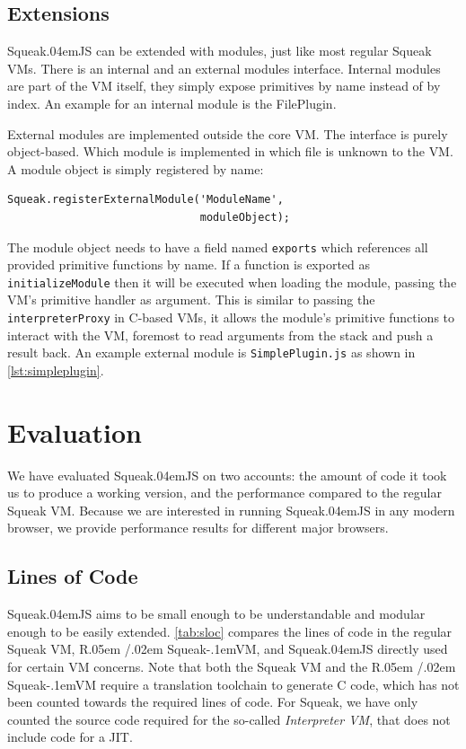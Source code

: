 \documentclass[natbib]{sigplanconf}
\newcommand*\SqueakJS{Squeak\texorpdfstring{\kern.04em}{}JS\xspace}
\newcommand*\RSqueakVM{R\kern.05em /\kern.02em Squeak\kern-.1emVM\xspace}
\begin{document}
\subsection{Extensions}

\SqueakJS can be extended with modules, just like most regular Squeak
\acp{VM}. There is an internal and an external modules interface.
Internal modules are part of the \ac{VM} itself, they simply expose
primitives by name instead of by index. An example for an internal
module is the FilePlugin.

External modules are implemented outside the core \ac{VM}. The
interface is purely object-based. Which module is implemented in which
file is unknown to the \ac{VM}. A module object is simply registered
by name:
\begin{lstlisting}[numbers=none,columns=fixed]
Squeak.registerExternalModule('ModuleName',
                              moduleObject);
\end{lstlisting}

The module object needs to have a field named \lstinline|exports|
which references all provided primitive functions by name. If a
function is exported as \lstinline|initializeModule| then it will be
executed when loading the module, passing the \ac{VM}'s primitive
handler as argument. This is similar to passing the
\lstinline|interpreterProxy| in C-based \acp{VM}, it allows the
module's primitive functions to interact with the \ac{VM}, foremost to
read arguments from the stack and push a result back. An example
external module is \lstinline|SimplePlugin.js| as shown in
\autoref{lst:simpleplugin}.

\section{Evaluation}
\label{sec:eval}

We have evaluated \SqueakJS on two accounts: the amount of code it
took us to produce a working version, and the performance compared to
the regular Squeak \ac{VM}. Because we are interested in running
\SqueakJS in any modern browser, we provide performance results for
different major browsers.

\subsection{Lines of Code}

\SqueakJS aims to be small enough to be understandable and modular
enough to be easily extended. \autoref{tab:sloc} compares the lines of
code in the regular Squeak \ac{VM}, \RSqueakVM, and \SqueakJS directly
used for certain \ac{VM} concerns. Note that both the Squeak \ac{VM}
and the \RSqueakVM require a translation toolchain to generate C code,
which has not been counted towards the required lines of code. For
Squeak, we have only counted the source code required for the
so-called \emph{Interpreter \ac{VM}}, that does not include code for a
\ac{JIT}.
\end{document}

